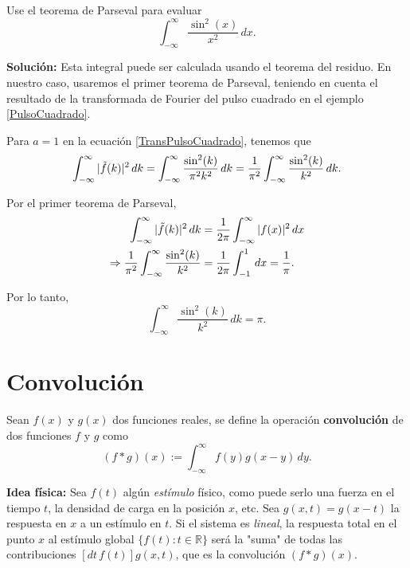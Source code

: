 \begin{ejemplo}
    Use el teorema de Parseval para evaluar
    $$\int_{-\infty}^{\infty}  \frac{\sin^2(x)}{x^2} \,dx.$$

    \textbf{Solución:} Esta integral puede ser calculada usando el teorema del residuo. En nuestro caso, usaremos el primer teorema de Parseval, teniendo en cuenta el resultado de la transformada de Fourier del pulso cuadrado en el ejemplo \ref{PulsoCuadrado}. 

    Para $a = 1$ en la ecuación \eqref{TransPulsoCuadrado}, tenemos que
    $$\int_{- \infty}^{\infty} |\Tilde{f}(k)|^2 \,dk = \int_{- \infty}^{\infty} \frac{\sin^2(k)}{\pi^2 k^2}  \,dk = \frac{1}{\pi^2} \int_{-\infty}^{\infty}  \frac{\sin^2(k)}{k^2} \,dk.$$

    Por el primer teorema de Parseval,
    \begin{align*}
        \int_{- \infty}^{\infty} |\Tilde{f}(k)|^2 \,dk &= \frac{1}{2\pi} \int_{-\infty}^{\infty} |f(x)|^2 \,dx \\
        \Rightarrow \frac{1}{\pi^2} \int_{-\infty}^{\infty}  \frac{\sin^2(k)}{k^2} &= \frac{1}{2\pi} \int_{-1}^1 \,dx = \frac{1}{\pi}. 
    \end{align*}

Por lo tanto,
$$\int_{-\infty}^{\infty}  \frac{\sin^2(k)}{k^2} \,dk = \pi.$$
\end{ejemplo}

\section{Convolución}

\begin{defi}
Sean $f(x)$ y $g(x)$ dos funciones reales, se define la operación \textbf{convolución} de dos funciones $f$ y $g$ como 
\begin{equation}
 (f*g)(x) := \int_{-\infty}^{\infty} f(y) g(x-y) \,dy.   \label{Convolucion}
\end{equation}

\end{defi}

\textbf{Idea física:} Sea $f(t)$ algún \emph{estímulo} físico, como puede serlo una fuerza en el tiempo $t$, la densidad de carga en la posición $x$, etc. Sea $g(x,t) = g(x-t)$ la respuesta en $x$ a un estímulo en $t$. Si el sistema es \textit{lineal}, la respuesta total en el punto $x$ al estímulo global $\{f(t) : t \in \mathbb{R}\}$ será la "suma" de todas las contribuciones $[dt\, f(t)] g(x,t)$, que es la convolución $(f*g)(x)$. 

